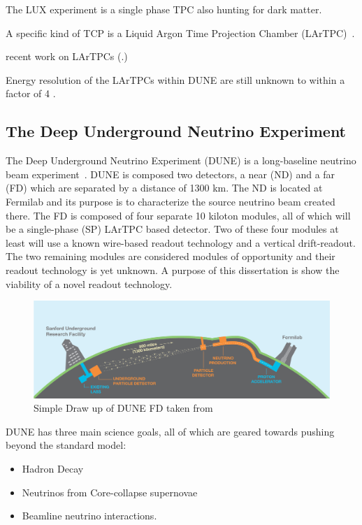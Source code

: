 The LUX experiment is a single phase TPC also hunting for dark matter.

A specific kind of TCP is a Liquid Argon Time Projection Chamber (LArTPC)~\citep{rubbia1977liquid}.

recent work on LArTPCs (\citep{ArgoNeuT_PhysRevD.99.012002, MicroBooNE_Acciarri_2017, LArIAT_Acciarri_2020}.)


Energy resolution of the LArTPCs within DUNE are still unknown to within a factor of 4 \citep{lartpc_energy_resolution:PhysRevD.99.036009}.

\subsection{The Deep Underground Neutrino Experiment}

The Deep Underground Neutrino Experiment (DUNE) is a long-baseline neutrino beam experiment~\citep{DUNE_TDR_V1_Abi_2020, DUNE_FD_TDRv2_2020, DUNE_TDRv3_Abi_2020, DUNE-FD_TDRv4:Abi_2020}.
DUNE is composed two detectors, a near (ND) and a far (FD) which are separated by a distance of 1300 km.
The ND is located at Fermilab and its purpose is to characterize the source neutrino beam created there.
The FD is composed of four separate 10 kiloton modules, all of which will be a single-phase (SP) LArTPC based detector.
Two of these four modules at least will use a known wire-based readout technology and a vertical drift-readout.
The two remaining modules are considered modules of opportunity and their readout technology is yet unknown.
A purpose of this dissertation is show the viability of a novel readout technology.

\begin{figure}[]
\centering
\includegraphics[width=\textwidth]{images/LBNE_Graphic_061615_2016.jpg}
\caption{Simple Draw up of DUNE FD taken from~\citep{dune_cdr_2016_arxiv}}
\end{figure}

DUNE has three main science goals, all of which are geared towards pushing beyond the standard model:
\begin{itemize}
    \item Hadron Decay
    \item Neutrinos from Core-collapse supernovae
    \item Beamline neutrino interactions.
\end{itemize}
~\label{item:dune_props}

